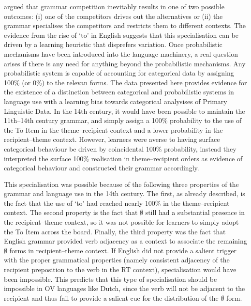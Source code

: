 	\cite{Wallenberg.2013} argued that grammar competition inevitably results in one of two possible outcomes: (i) one of the competitors drives out the alternatives or (ii) the grammar specialises the competitors and restricts them to different contexts. The evidence from the rise of `to' in English suggests that this specialisation can be driven by a learning heuristic that disprefers variation. Once probabilistic mechanisms have been introduced into the language machinery, a real question arises if there is any need for anything beyond the probabilistic mechanisms. Any probabilistic system is capable of accounting for categorical data by assigning 100\% (or 0\%) to the relevan forms. The data presented here provides evidence for the existence of a distinction between categorical and probabilistic systems in language use with a learning bias towards categorical analysises of Primary Linguistic Data. In the 14th century, it would have been possible to maintain the 11th--14th century grammar, and simply assign a 100\% probability to the use of the To Item in the theme--recipient context and a lower probability in the recipient--theme context. However, learners were averse to having surface categorical behaviour be driven by coincidental 100\% probability, instead they interpreted the surface 100\% realisation in theme--recipient orders as evidence of categorical behaviour and constructed their grammar accordingly.

	This specialisation was possible because of the following three properties of the grammar and language use in the 14th century. The first, as already described, is the fact that the use of `to' had reached nearly 100\% in the theme--recipient context. The second property is the fact that $\emptyset$ still had a substantial presence in the recipient--theme context, so it was not possible for learners to simply adopt the To Item across the board. Finally, the third property was the fact that English grammar provided verb adjacency as a context to associate the remaining $\emptyset$ forms in recipient--theme context. If English did not provide a salient trigger with the proper grammatical properties (namely consistent adjacency of the recipient preposition to the verb in the RT context), specialisation would have been impossible. This predicts that this type of specialisation should be impossible in OV languages like Dutch, since the verb will not be adjacent to the recipient and thus fail to provide a salient cue for the distribution of the $\emptyset$ form. 

